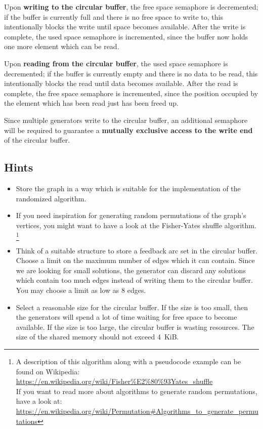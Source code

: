 Upon \textbf{writing to the circular buffer}, the free space semaphore is decremented;
if the buffer is currently full and there is no free space to write to,
this intentionally blocks the write until space becomes available.
After the write is complete, the used space semaphore is incremented,
since the buffer now holds one more element which can be read.

Upon \textbf{reading from the circular buffer}, the used space semaphore is decremented;
if the buffer is currently empty and there is no data to be read,
this intentionally blocks the read until data becomes available.
After the read is complete, the free space semaphore is incremented,
since the position occupied by the element which has been read just has been freed up.

Since multiple generators write to the circular buffer,
an additional semaphore will be required
to guarantee a \textbf{mutually exclusive access to the write end} of the circular buffer.

\subsection*{Hints}
\begin{itemize}
\item Store the graph in a way which is suitable for the implementation of the randomized algorithm.

\item If you need inspiration for generating random permutations of the graph's vertices,
you might want to have a look at the Fisher-Yates shuffle algorithm.
\footnote{
A description of this algorithm along with a pseudocode example can be found on Wikipedia:\\
\url{https://en.wikipedia.org/wiki/Fisher\%E2\%80\%93Yates_shuffle}\\
If you want to read more about algorithms to generate random permutations, have a look at:\\
\url{https://en.wikipedia.org/wiki/Permutation\#Algorithms_to_generate_permutations}
}

\item Think of a suitable structure to store a feedback arc set in the circular buffer.
Choose a limit on the maximum number of edges which it can contain.
Since we are looking for small solutions,
the generator can discard any solutions which contain too much edges
instead of writing them to the circular buffer.
You may choose a limit as low as 8 edges.

\item Select a reasonable size for the circular buffer.
If the size is too small,
then the generators will spend a lot of time waiting for free space to become available.
If the size is too large,
the circular buffer is wasting resources.
The size of the shared memory should not exceed 4~KiB.

\end{itemize}

